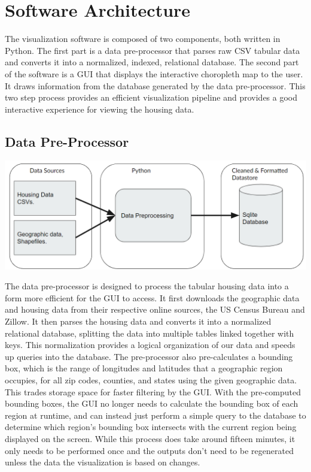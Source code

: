 \documentclass{article}
\begin{document}
\section{Software Architecture}
The visualization software is composed of two components, both written in Python. The first 
part is a data pre-processor that parses raw CSV tabular data and converts it into
a normalized, indexed, relational database. The second part of the software is a GUI that 
displays the interactive choropleth map to the user. It draws information 
from the database generated by the data pre-processor. This two step process provides an
efficient visualization pipeline and provides a good interactive experience for viewing the housing data.

\subsection{Data Pre-Processor}
\begin{center}
  \includegraphics[scale=0.5]{sysarch_pre.png} 
\end{center}  
The data pre-processor is designed to process the tabular housing data into a form more efficient
for the GUI to access. It first downloads the geographic data and housing data from their respective online
sources, the US Census Bureau and Zillow. It then parses the housing data and converts it into a normalized
relational database, splitting the data into multiple tables linked together with keys. This normalization
provides a logical organization of our data and speeds up queries into the database. The pre-processor also
pre-calculates a bounding box, which is the range of longitudes and latitudes that a geographic region occupies,
for all zip codes, counties, and states using the given geographic data. This trades storage space for faster filtering by the GUI. With the 
pre-computed bounding boxes, the GUI no longer needs to calculate the bounding box of each region at runtime,
and can instead just perform a simple query to the database to determine which region's bounding box intersects
with the current region being displayed on the screen. While this process does take around fifteen minutes, it only needs to be performed
once and the outputs don't need to be regenerated unless the data the visualization is based on changes.
\end{document}
